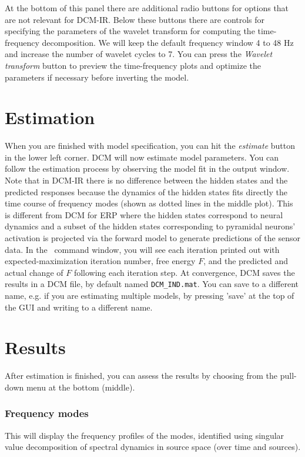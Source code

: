 At the bottom of this panel there are additional radio buttons for options that are not relevant for DCM-IR. Below these buttons there are controls for specifying the parameters of the wavelet transform for computing the time-frequency decomposition. We will keep the default frequency window 4 to 48 Hz and increase the number of wavelet cycles to 7. You can press the \textit{Wavelet transform} button to preview the time-frequency plots and optimize the parameters if necessary before inverting the model.  


\section{Estimation}
When you are finished with model specification, you can hit the \textit{estimate} button in the lower left corner. DCM will now estimate model parameters. You can follow the estimation process by observing the model fit in the output window. Note that in DCM-IR there is no difference between the hidden states and the predicted responses because the dynamics of the hidden states fits directly the time course of frequency modes (shown as dotted lines in the middle plot). This is different from DCM for ERP where the hidden states correspond to neural dynamics and a subset of the hidden states corresponding to pyramidal neurons' activation is projected via the forward model to generate predictions of the sensor data. In the \matlab\ command window, you will see each iteration printed out with expected-maximization iteration number, free energy $F$, and the predicted and actual change of $F$ following each iteration step. At convergence, DCM saves the results in a DCM file, by default named \texttt{DCM\_IND.mat}. You can save to a different name, e.g. if you are estimating multiple models, by pressing 'save' at the top of the GUI and writing to a different name.

\section{Results}
After estimation is finished, you can assess the results by choosing from the pull-down menu at the bottom (middle).

\subsubsection{Frequency modes}
This will display the frequency profiles of the modes, identified using singular value decomposition of spectral dynamics in source space (over time and sources).

